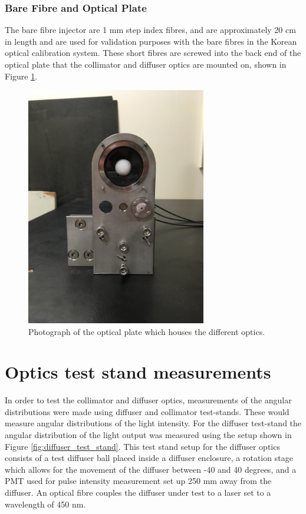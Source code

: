 \subsubsection{Bare Fibre and Optical Plate}

The bare fibre injector are 1 mm step index fibres, and are approximately 20 cm in length and are used for validation purposes with the bare fibres in the Korean optical calibration system. These short fibres are screwed into the back end of the optical plate that the collimator and diffuser optics are mounted on, shown in Figure \ref{fig:optical_plate}.

\begin{figure}
    \centering
    \includegraphics[width=0.7\textwidth, angle =270]{Figures/optical_plate.jpg}
    \caption{Photograph of the optical plate which houses the different optics.}
    \label{fig:optical_plate}
\end{figure}


\section{Optics test stand measurements}

In order to test the collimator and diffuser optics, measurements of the angular distributions were made using diffuser and collimator test-stands. These would measure angular distributions of the light intensity. For the diffuser test-stand the angular distribution of the light output was measured using the setup shown in Figure \ref{fig:diffuser_test_stand}. This test stand setup for the diffuser optics consists of a test diffuser ball placed inside a diffuser enclosure, a rotation stage which allows for the movement of the diffuser between -40 and 40 degrees, and a PMT used for pulse intensity measurement set up 250 mm away from the diffuser. An optical fibre couples the diffuser under test to a laser set to a wavelength of 450 nm. 


